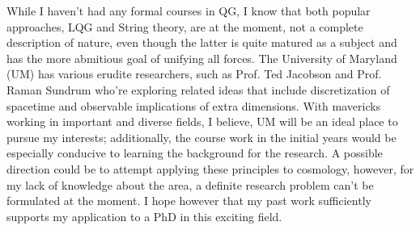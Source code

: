 While I haven't had any formal courses in QG, I know that both popular approaches, LQG and String theory, are at the moment, not a complete description of nature, even though the latter is quite matured as a subject and has the more abmitious goal of unifying all forces. The University of Maryland (UM) has various erudite researchers, such as Prof. Ted Jacobson and Prof. Raman Sundrum who're exploring related ideas that include discretization of spacetime and observable implications of extra dimensions. With mavericks working in important and diverse fields, I believe, UM will be an ideal place to pursue my interests; additionally, the course work in the initial years would be especially conducive to learning the background for the research. A possible direction could be to attempt applying these principles to cosmology, however, for my lack of knowledge about the area, a definite research problem can't be formulated at the moment. I hope however that my past work sufficiently supports my application to a PhD in this exciting field.






